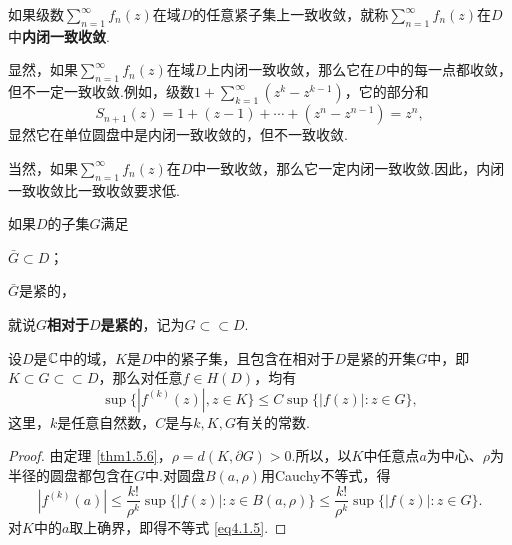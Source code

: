 \begin{definition}\label{def4.1.6}
  如果级数$\sum_{n=1}^\infty f_n(z)$在域$D$的任意紧子集上一致收敛，就称$\sum_{n=1}^\infty f_n(z)$在$D$中\textbf{内闭一致收敛}.
\end{definition}

显然，如果$\sum_{n=1}^\infty f_n(z)$在域$D$上内闭一致收敛，那么它在$D$中的每一点都收敛，但不一定一致收敛.例如，级数$1+\sum_{k=1}^\infty(z^k-z^{k-1})$，它的部分和
\[
  S_{n+1}(z) = 1 + (z-1) + \cdots + (z^n - z^{n-1}) = z^n,
\]
显然它在单位圆盘中是内闭一致收敛的，但不一致收敛.

当然，如果$\sum_{n=1}^\infty f_n(z)$在$D$中一致收敛，那么它一定内闭一致收敛.因此，内闭一致收敛比一致收敛要求低.
\begin{definition}\label{def4.1.7}
  如果$D$的子集$G$满足
  \begin{eenum}
    \item $\bar G\subset D$；
    \item $\bar G$是紧的，
  \end{eenum}
  就说\textbf{$G$相对于$D$是紧的}，记为$G\subset\subset D$.
\end{definition}
\begin{lemma}\label{lemma4.1.8}
  设$D$是$\mathbb C$中的域，$K$是$D$中的紧子集，且包含在相对于$D$是紧的开集$G$中，即$K\subset G\subset\subset D$，那么对任意$f\in H(D)$，均有
  \begin{equation}\label{eq4.1.5}
    \sup\{|f^{(k)}(z)|, z\in K\} \le C\sup\{|f(z)|:z\in G\},
  \end{equation}
  这里，$k$是任意自然数，$C$是与$k,K,G$有关的常数.
\end{lemma}
\begin{proof}
  由定理 \ref{thm1.5.6}，$\rho=d(K,\partial G)>0$.所以，以$K$中任意点$a$为中心、$\rho$为半径的圆盘都包含在$G$中.对圆盘$B(a,\rho)$用Cauchy不等式，得
  \[
    |f^{(k)}(a)| \le\frac{k!}{\rho^k} \sup\{|f(z)|:z\in B(a,\rho)\} \le \frac{k!}{\rho^k}
    \sup\{|f(z)|:z\in G\}.
  \]
  对$K$中的$a$取上确界，即得不等式 \eqref{eq4.1.5}.
\end{proof}

